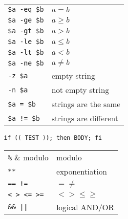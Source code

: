 \documentclass[a4paper, twocolumn]{article}
\renewcommand{\tt}{\texttt}
\begin{document}
\begin{tabular}{ll}
    \verb|$a -eq $b|    & $a = b$                                   \\
    \verb|$a -ge $b|    & $a \geq b$                                \\
    \verb|$a -gt $b|    & $a > b$                                   \\
    \verb|$a -le $b|    & $a \leq b$                                \\
    \verb|$a -lt $b|    & $a < b$                                   \\
    \verb|$a -ne $b|    & $a \neq b$                                \\
    \verb|-z $a|        & empty string                              \\
    \verb|-n $a|        & not empty string                          \\
    \verb|$a = $b|      & strings are the same                      \\
    \verb|$a != $b|     & strings are different
\end{tabular}

\vspace{0.5cm}
\tt{if (( TEST )); then BODY; fi}
\vspace{0.3cm}

\begin{tabular}{ll}
    \verb|%|            & modulo                                    \\
    \verb|**|           & exponentiation                            \\
    \verb|== !=|        & $= \neq$                                  \\
    \verb|< > <= >=|    & $< > \leq \geq$                           \\
    \verb!&& ||!        & logical AND/OR
\end{tabular}
\end{document}
